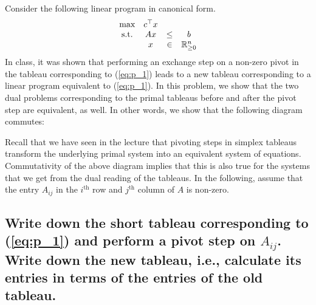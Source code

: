 \documentclass[12pt, a4]{article}
\begin{document}
{Consider the following linear program in canonical form.
\begin{equation}{\label{eq:p_1}}
	\begin{matrix}
		\text{max}& c^\top x &  & \\ 
		\text{s.t.} & Ax &\leq  &b \\ 
		&  x&\in  & \mathbb{R}^n_{\geq0} 
	\end{matrix}
\end{equation}
In class, it was shown that performing an exchange step on a non-zero pivot in the tableau corresponding to (\ref{eq:p_1}) leads to a new tableau corresponding to a linear program equivalent to (\ref{eq:p_1}). In this problem, we show that the two dual problems corresponding to the primal tableaus before and after the pivot step are equivalent, as well. In other words, we show that the following diagram commutes:
\begin{center}
\end{center}
Recall that we have seen in the lecture that pivoting steps in simplex tableaus transform the underlying primal system into an equivalent system of equations. Commutativity of the above diagram implies that this is also true for the systems that we get from the dual reading of the tableaus. In the following, assume that the entry $A_{ij}$ in the $i^{\text{th}}$ row and $j^{\text{th}}$ column of $A$ is non-zero.

\subsection{Write down the short tableau corresponding to (\ref{eq:p_1}) and perform a pivot step on $A_{ij}$. Write down the new tableau, i.e., calculate its entries in terms of the entries of the old tableau.}{\label{sec:4a}}

}
\end{document}
